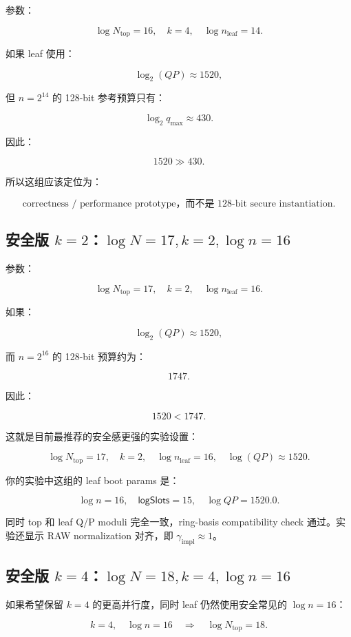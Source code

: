 \documentclass[UTF8,11pt,a4paper]{ctexart}
\newcommand{\logSlots}{\mathsf{logSlots}}
\begin{document}
参数：

\[
\log N_{\text{top}}=16,\quad k=4,\quad \log n_{\text{leaf}}=14.
\]

如果 leaf 使用：

\[
\log_2(QP)\approx 1520,
\]

但 $n=2^{14}$ 的 128-bit 参考预算只有：

\[
\log_2 q_{\max}\approx 430.
\]

因此：

\[
1520 \gg 430.
\]

所以这组应该定位为：

\[
\boxed{
\text{correctness / performance prototype，而不是 128-bit secure instantiation.}
}
\]

\subsection{安全版 $k=2$：$\log N=17,k=2,\log n=16$}

参数：

\[
\log N_{\text{top}}=17,\quad k=2,\quad \log n_{\text{leaf}}=16.
\]

如果：

\[
\log_2(QP)\approx 1520,
\]

而 $n=2^{16}$ 的 128-bit 预算约为：

\[
1747.
\]

因此：

\[
1520 < 1747.
\]

这就是目前最推荐的安全感更强的实验设置：

\[
\boxed{
\log N_{\text{top}}=17,\quad k=2,\quad \log n_{\text{leaf}}=16,\quad \log(QP)\approx 1520.
}
\]

你的实验中这组的 leaf boot params 是：

\[
\log n=16,\quad \logSlots=15,\quad \log QP=1520.0.
\]

同时 top 和 leaf Q/P moduli 完全一致，ring-basis compatibility check 通过。实验还显示 RAW normalization 对齐，即 $\gamma_{\mathrm{impl}}\approx 1$。

\subsection{安全版 $k=4$：$\log N=18,k=4,\log n=16$}

如果希望保留 $k=4$ 的更高并行度，同时 leaf 仍然使用安全常见的 $\log n=16$：

\[
k=4,\quad \log n=16
\quad\Rightarrow\quad
\log N_{\text{top}}=18.
\]
\end{document}
